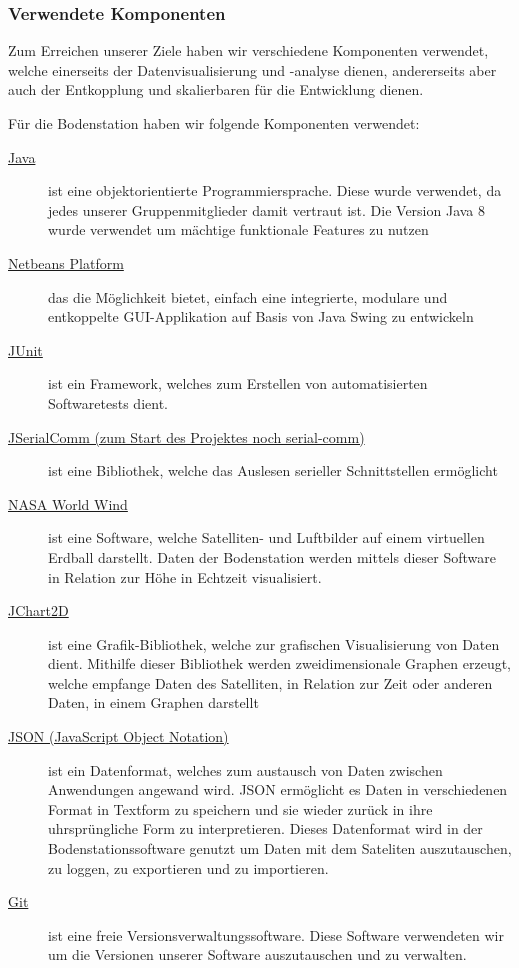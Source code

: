 \subsubsection{Verwendete Komponenten}
Zum Erreichen unserer Ziele haben wir verschiedene Komponenten verwendet, welche einerseits der Datenvisualisierung und -analyse dienen, andererseits aber auch der Entkopplung und skalierbaren für die Entwicklung dienen.

Für die Bodenstation haben wir folgende Komponenten verwendet:
\begin{description}
	\item[\href{http://www.oracle.com/technetwork/java/javase/downloads/jdk8-downloads-2133151.html}{Java}] ist eine objektorientierte Programmiersprache. Diese wurde verwendet, da jedes unserer Gruppenmitglieder damit vertraut ist. Die Version Java 8 wurde verwendet um mächtige funktionale Features zu nutzen
	\item[\href{https://netbeans.org/features/platform/}{Netbeans Platform}] das die Möglichkeit bietet, einfach eine integrierte, modulare und entkoppelte GUI-Applikation auf Basis von Java Swing zu entwickeln
	\item[\href{http://junit.org/}{JUnit}] ist ein Framework, welches zum Erstellen von automatisierten Softwaretests dient.
	\item[\href{http://fazecast.github.io/jSerialComm/}{JSerialComm (zum Start des Projektes noch serial-comm)}] ist eine Bibliothek, welche das Auslesen serieller Schnittstellen ermöglicht 
	\item[\href{http://worldwind.arc.nasa.gov/java/}{NASA World Wind}] ist eine Software, welche Satelliten- und Luftbilder auf einem virtuellen Erdball darstellt. Daten der Bodenstation werden mittels dieser Software in Relation zur Höhe in Echtzeit visualisiert.
	\item[\href{http://jchart2d.sourceforge.net/}{JChart2D}] ist eine Grafik-Bibliothek, welche zur grafischen Visualisierung von Daten dient. Mithilfe dieser Bibliothek werden zweidimensionale Graphen erzeugt, welche empfange Daten des Satelliten, in Relation zur Zeit oder anderen Daten, in einem Graphen darstellt
	\item[\href{http://www.json.org/}{JSON (JavaScript Object Notation)}] ist ein Datenformat, welches zum austausch von Daten zwischen Anwendungen angewand wird. JSON ermöglicht es Daten in verschiedenen Format in Textform zu speichern und sie wieder zurück in ihre uhrsprüngliche Form zu interpretieren. Dieses Datenformat wird in der Bodenstationssoftware genutzt um Daten mit dem Sateliten auszutauschen, zu loggen, zu exportieren und zu importieren.
	\item[\href{http://git-scm.com/}{Git}] ist eine freie Versionsverwaltungssoftware. Diese Software verwendeten wir um die Versionen unserer Software auszutauschen und zu verwalten.
\end{description}